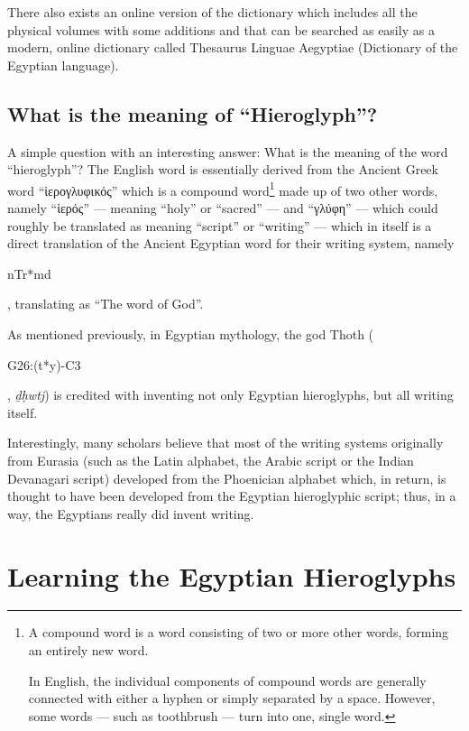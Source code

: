 \documentclass[a5paper,twoside,11pt]{report}
\begin{document}
  There also exists an online version of the dictionary which includes all the physical volumes with some additions and that can be searched as easily as a modern, online dictionary called Thesaurus Linguae Aegyptiae (Dictionary of the Egyptian language).

\chapter*{What is the meaning of ``Hieroglyph''?}

  A simple question with an interesting answer: What is the meaning of the word “hieroglyph”?
	The English word is essentially derived from the Ancient Greek word “ἱερογλυφικός” which is a compound word\footnote{A compound word is a word consisting of two or more other words, forming an entirely new word.

	In English, the individual components of compound words are generally connected with either a hyphen or simply separated by a space. However, some words — such as toothbrush — turn into one, single word.} made up of two other words, namely “ἱερός” — meaning “holy” or “sacred” — and “γλύφη” — which could roughly be translated as meaning “script” or “writing” — which in itself is a direct translation of the Ancient Egyptian word for their writing system, namely \begin{hieroglyph}nTr*md\end{hieroglyph}, translating as “The word of God”.

	As mentioned previously, in Egyptian mythology, the god Thoth (\begin{hieroglyph}G26:(t*y)-C3\end{hieroglyph}, \textit{ḏḥwtj}) is credited with inventing not only Egyptian hieroglyphs, but all writing itself.

	Interestingly, many scholars believe that most of the writing systems originally from Eurasia (such as the Latin alphabet, the Arabic script or the Indian Devanagari script) developed from the Phoenician alphabet which, in return, is thought to have been developed from the Egyptian hieroglyphic script; thus, in a way, the Egyptians really did invent writing. 

\part*{Learning the Egyptian Hieroglyphs}
  \newpage
\end{document}
